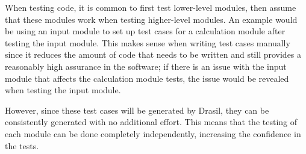 When testing code, it is common to first test lower-level modules, then assume
that these modules work when testing higher-level modules. An example would be
using an input module to set up test cases for a calculation module after
testing the input module. This makes sense when writing test cases manually
since it reduces the amount of code that needs to be written and still provides
a reasonably high assurance in the software; if there is an issue with the
input module that affects the calculation module tests, the issue would be
revealed when testing the input module.

However, since these test cases will be generated by Drasil, they can be
consistently generated with no additional effort. This means that the testing
of each module can be done completely independently, increasing the confidence
in the tests.
